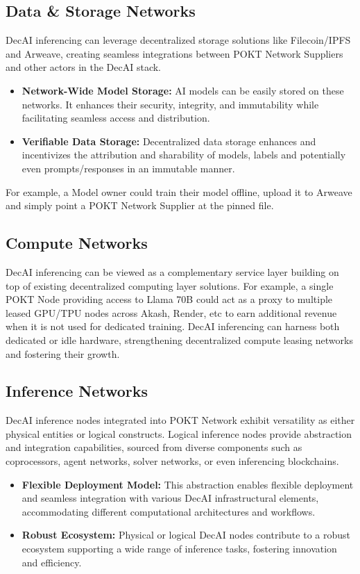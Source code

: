 \documentclass[conference,compsoc]{IEEEtran}
\begin{document}
\subsection{Data \& Storage Networks}
DecAI inferencing can leverage decentralized storage solutions like Filecoin/IPFS and Arweave, creating seamless integrations between POKT Network Suppliers and other actors in the DecAI stack.

\begin{itemize}
    \item \textbf{Network-Wide Model Storage:} AI models can be easily stored on these networks. It enhances their security, integrity, and immutability while facilitating seamless access and distribution.

    \item \textbf{Verifiable Data Storage:} Decentralized data storage enhances and incentivizes the attribution and sharability of models, labels and potentially even prompts/responses in an immutable manner.

\end{itemize}
For example, a Model owner could train their model offline, upload it to Arweave and simply point a POKT Network Supplier at the pinned file.


\subsection{Compute Networks}
DecAI inferencing can be viewed as a complementary service layer building on top of existing decentralized computing layer solutions. For example, a single POKT Node providing access to Llama 70B could act as a proxy to multiple leased GPU/TPU nodes across Akash, Render, etc to earn additional revenue when it is not used for dedicated training. DecAI inferencing can harness both dedicated or idle hardware, strengthening decentralized compute leasing networks and fostering their growth.

\subsection{Inference Networks}
DecAI inference nodes integrated into POKT Network exhibit versatility as either physical entities or logical constructs. Logical inference nodes provide abstraction and integration capabilities, sourced from diverse components such as coprocessors, agent networks, solver networks, or even inferencing blockchains.

\begin{itemize}
    \item \textbf{Flexible Deployment Model:} This abstraction enables flexible deployment and seamless integration with various DecAI infrastructural elements, accommodating different computational architectures and workflows.

    \item \textbf{Robust Ecosystem:} Physical or logical DecAI nodes contribute to a robust ecosystem supporting a wide range of inference tasks, fostering innovation and efficiency.

\end{itemize}
\end{document}
